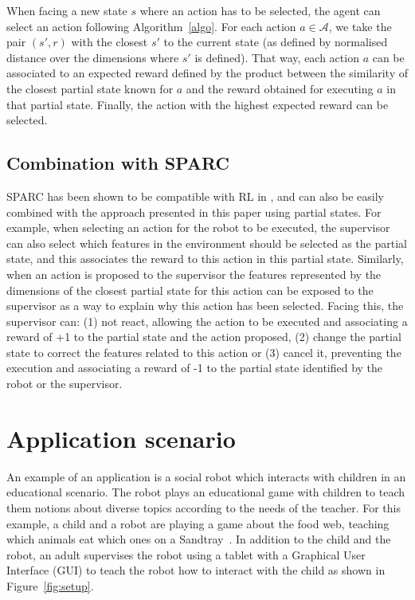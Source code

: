 \documentclass[letterpaper]{article} %
\begin{document}
When facing a new state $s$ where an action has to be selected, the agent can
select an action following Algorithm~\ref{algo}. For each action $a \in
\mathcal{A}$, we take the pair $(s',r)$ with the closest $s'$ to the current
state (as defined by normalised distance over the dimensions where $s'$ is
defined). That way, each action $a$ can be associated to an expected reward
defined by the product between the similarity of the closest partial state known
for $a$ and the reward obtained for executing $a$ in that partial state.
Finally, the action with the highest expected reward can be selected.


\subsection{Combination with SPARC}

SPARC has been shown to be compatible with RL in \cite{senft2017supervised}, and
can also be easily combined with the approach presented in this paper using
partial states. For example, when selecting an action for the robot to be
executed, the supervisor can also select which features in the environment
should be selected as the partial state, and this associates the reward to this
action in this partial state. Similarly, when an action is proposed to the
supervisor the features represented by the dimensions of the closest partial
state for this action can be exposed to the supervisor as a way to explain why
this action has been selected. Facing this, the supervisor can: (1) not react,
allowing the action to be executed and associating a reward of +1 to the partial
state and the action proposed, (2) change the partial state to correct the
features related to this action or (3) cancel it, preventing the execution and
associating a reward of -1 to the partial state identified by the robot or the
supervisor. 

\section{Application scenario}


An example of an application is a social robot which interacts with children in
an educational scenario.  The robot plays an educational game with children to
teach them notions about diverse topics according to the needs of the teacher.
For this example, a child and a robot are playing a game about the food web,
teaching which animals eat which ones on a Sandtray~\cite{baxter2012touchscreen}.
In addition to the child and the robot, an adult supervises the robot using a
tablet with a Graphical User Interface (GUI) to teach the robot how to interact
with the child as shown in Figure~\ref{fig:setup}.
\end{document}
